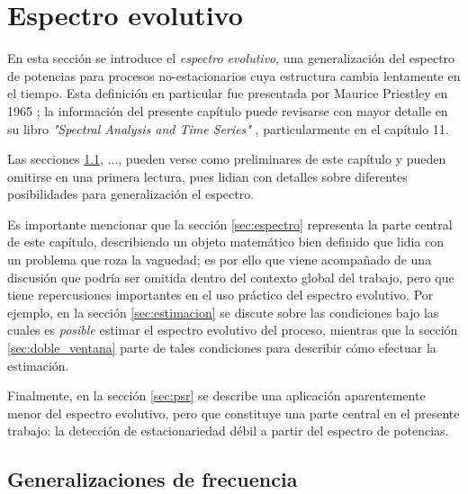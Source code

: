 
\chapter{Espectro evolutivo}

En esta sección se introduce el \textit{espectro evolutivo}, una generalización del espectro de 
potencias para procesos no-estacionarios cuya estructura cambia lentamente en el tiempo.
%
Esta definición en particular fue presentada por Maurice Priestley en 1965 \cite{Priestley65}; la
información del presente capítulo puede revisarse con mayor detalle en su libro \textit{"Spectral
Analysis and Time Series"} \cite{Priestley81}, particularmente en el capítulo 11.

Las secciones \ref{sec:frecuencias2}, ..., pueden verse como preliminares de este capítulo y pueden
omitirse en una primera lectura, pues lidian con detalles sobre diferentes posibilidades para 
generalización el espectro.

Es importante mencionar que la sección \ref{sec:espectro} representa la parte central de este capítulo, describiendo un objeto matemático bien definido que lidia con un problema que roza la vaguedad; es por ello que viene acompañado de una discusión que podría ser omitida dentro del contexto global del trabajo, pero que tiene repercusiones importantes en el uso práctico del espectro evolutivo.
%
Por ejemplo, en la sección \ref{sec:estimacion} se discute sobre las condiciones bajo las cuales es \textit{posible} estimar el espectro evolutivo del proceso, mientras que la sección \ref{sec:doble_ventana} parte de tales condiciones para describir cómo efectuar la estimación.

Finalmente, en la sección \ref{sec:psr} se describe una aplicación aparentemente menor del espectro evolutivo, pero que constituye una parte central en el presente trabajo: la detección de estacionariedad débil a partir del espectro de potencias.


\section{Generalizaciones de frecuencia}
\label{sec:frecuencias2}

